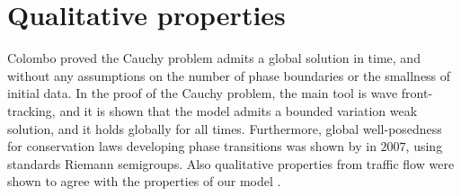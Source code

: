 \documentclass[10pt]{article}
\numberwithin{equation}{section}
\begin{document}

\newpage

\section{Qualitative properties}
Colombo proved the Cauchy problem admits a global solution in time, and without any assumptions on the number of phase boundaries or the smallness of initial data. In the proof of the Cauchy problem, the main tool is wave front-tracking, and it is shown that the model admits a bounded variation weak solution, and it holds globally for all times. Furthermore, global well-posedness for conservation laws developing phase transitions was shown by \cite{ColomboGoatinPriuli} in $2007$, using standards Riemann semigroups. 
Also qualitative properties from traffic flow were shown to agree with the properties of our model \cite{Colombo2003}.   
\end{document}
